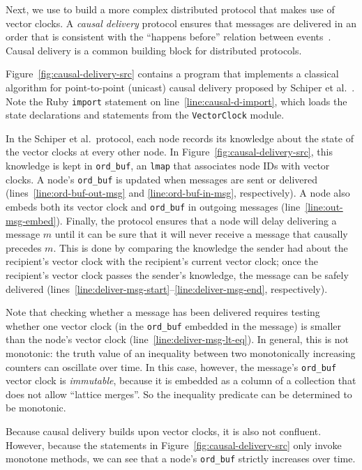 Next, we use \lang to build a more complex distributed protocol that makes use
of vector clocks. A \emph{causal delivery} protocol ensures that messages are
delivered in an order that is consistent with the ``happens before'' relation
between events~\cite{Lamport1978}. Causal delivery is a common
building block for distributed protocols.

Figure~\ref{fig:causal-delivery-src} contains a \lang program that implements a
classical algorithm for point-to-point (unicast) causal delivery proposed by
Schiper et al.~\cite{Schiper1989}. Note the Ruby \texttt{import} statement on
line~\ref{line:causal-d-import}, which loads the \lang state declarations and
statements from the \texttt{VectorClock} module.

In the Schiper et al.\ protocol, each node records its knowledge about the state
of the vector clocks at every other node. In
Figure~\ref{fig:causal-delivery-src}, this knowledge is kept in
\texttt{ord\_buf}, an \texttt{lmap} that associates node IDs with vector
clocks. A node's \texttt{ord\_buf} is updated when messages are sent or
delivered (lines~\ref{line:ord-buf-out-msg} and \ref{line:ord-buf-in-msg},
respectively). A node also embeds both its vector clock and \texttt{ord\_buf} in
outgoing messages (line~\ref{line:out-msg-embed}). Finally, the protocol ensures
that a node will delay delivering a message $m$ until it can be sure that it
will never receive a message that causally precedes $m$. This is done by
comparing the knowledge the sender had about the recipient's vector clock with
the recipient's current vector clock; once the recipient's vector clock passes
the sender's knowledge, the message can be safely delivered
(lines~\ref{line:deliver-msg-start}--\ref{line:deliver-msg-end}, respectively).

Note that checking whether a message has been delivered requires testing whether
one vector clock (in the \texttt{ord\_buf} embedded in the message) is smaller
than the node's vector clock (line~\ref{line:deliver-msg-lt-eq}). In general,
this is not monotonic: the truth value of an inequality between two monotonically increasing counters can oscillate over time.  In this case, however, the message's \texttt{ord\_buf} vector clock is \emph{immutable}, because it is
embedded as a column of a collection that does not allow ``lattice merges''. So
the inequality predicate can be determined to be monotonic.

Because causal delivery builds upon vector clocks, it is also not
confluent. However, because the statements in
Figure~\ref{fig:causal-delivery-src} only invoke monotone methods, we can see
that a node's \texttt{ord\_buf} strictly increases over time.
